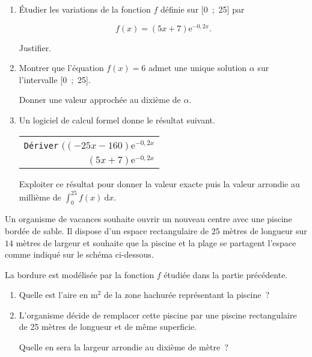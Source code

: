           \bigbreak
          \medbreak
          \begin{enumerate}
               \item Étudier les variations de la fonction $f$ définie sur [0~;~25] par
               \par
               \[f(x) = (5x + 7)\text{e}^{- 0,2x}.\]
               \par
               Justifier.
               \item  Montrer que l'équation $f(x) = 6$ admet une unique solution $\alpha$ sur l'intervalle [0~;~25].
               \par
               Donner une valeur approchée au dixième de $\alpha$.
               \item  Un logiciel de calcul formel donne le résultat suivant.
               \par
               \begin{center}
\begin{extern}%
                                   \renewcommand\arraystretch{1.8}
                    \begin{tabularx}{0.5\linewidth}{|X|}\hline%
                         \texttt{Dériver} $((- 25x - 160)\text{e}^{- 0,2x}$\\ 
                         \multicolumn{1}{|r|}{$(5x + 7)\text{e}^{- 0,2x}$}\\ \hline
                    \end{tabularx}

               \end{extern}
                              \end{center}
               Exploiter ce résultat pour donner la valeur exacte puis la valeur arrondie au millième de
               $\displaystyle\int_0^{25} f(x)\:\text{d}x$.
          \end{enumerate}
          \bigbreak
          \medbreak
          Un organisme de vacances souhaite ouvrir un nouveau centre avec une piscine bordée de
          sable. Il dispose d'un espace rectangulaire de $25$ mètres de longueur sur $14$ mètres de
          largeur et souhaite que la piscine et la \og plage \fg se partagent l'espace comme indiqué sur le schéma ci-dessous.
          \par
          La bordure est modélisée par la fonction $f$ étudiée dans la partie précédente.
          \medbreak
          \begin{enumerate}
               \item Quelle est l'aire en m$^2$ de la zone hachurée représentant la piscine~?
               \item L'organisme décide de remplacer cette piscine par une piscine rectangulaire de 25
               mètres de longueur et de même superficie.
               \par
               Quelle en sera la largeur arrondie au dixième de mètre~?
          \end{enumerate}
